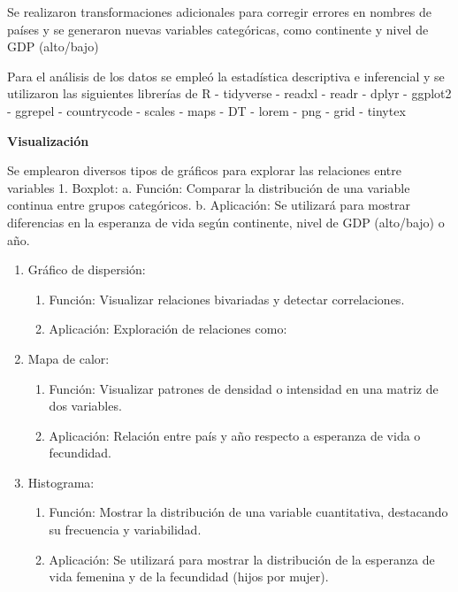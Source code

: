 \documentclass[
]{article}
\providecommand{\tightlist}{%
  \setlength{\itemsep}{0pt}\setlength{\parskip}{0pt}}
\begin{document}
Se realizaron transformaciones adicionales para corregir errores en
nombres de países y se generaron nuevas variables categóricas, como
continente y nivel de GDP (alto/bajo)

Para el análisis de los datos se empleó la estadística descriptiva e
inferencial y se utilizaron las siguientes librerías de R - tidyverse -
readxl - readr - dplyr - ggplot2 - ggrepel - countrycode - scales - maps
- DT - lorem - png - grid - tinytex

\textbf{Visualización}

Se emplearon diversos tipos de gráficos para explorar las relaciones
entre variables 1. Boxplot: a. Función: Comparar la distribución de una
variable continua entre grupos categóricos. b. Aplicación: Se utilizará
para mostrar diferencias en la esperanza de vida según continente, nivel
de GDP (alto/bajo) o año.

\begin{enumerate}
\def\labelenumi{\arabic{enumi}.}
\setcounter{enumi}{1}
\tightlist
\item
  Gráfico de dispersión:

  \begin{enumerate}
  \def\labelenumii{\alph{enumii}.}
  \tightlist
  \item
    Función: Visualizar relaciones bivariadas y detectar correlaciones.
  \item
    Aplicación: Exploración de relaciones como:
  \end{enumerate}
\item
  Mapa de calor:

  \begin{enumerate}
  \def\labelenumii{\alph{enumii}.}
  \tightlist
  \item
    Función: Visualizar patrones de densidad o intensidad en una matriz
    de dos variables.
  \item
    Aplicación: Relación entre país y año respecto a esperanza de vida o
    fecundidad.
  \end{enumerate}
\item
  Histograma:

  \begin{enumerate}
  \def\labelenumii{\alph{enumii}.}
  \tightlist
  \item
    Función: Mostrar la distribución de una variable cuantitativa,
    destacando su frecuencia y variabilidad.
  \item
    Aplicación: Se utilizará para mostrar la distribución de la
    esperanza de vida femenina y de la fecundidad (hijos por mujer).
  \end{enumerate}
\end{enumerate}
\end{document}

